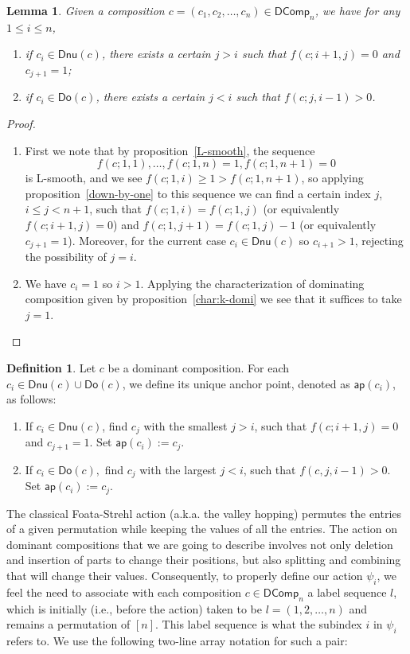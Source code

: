 \documentclass[reqno]{amsart}
\numberwithin{equation}{section}
\newtheorem{lemma}[theorem]{Lemma}
\theoremstyle{definition}
\newtheorem{definition}{Definition}[section]
\theoremstyle{named}
\def\DComp{\mathsf{DComp}}
\def\Dnu{\mathsf{Dnu}}
\def\Do{\mathsf{Do}}
\def\ap{\mathsf{ap}}
\begin{document}
\renewcommand\theenumi{\roman{enumi}}
\renewcommand\labelenumi{(\theenumi)}
\begin{lemma}\label{lemma-ap}
Given a composition $c=\left(c_1, c_2, \ldots, c_n\right) \in \DComp_n$, we have for any $1\le i\le n$,
\begin{enumerate}
	\item if $c_i\in \Dnu(c)$, there exists a certain $j>i$ such that $f(c;i+1,j)=0$ and $c_{j+1}=1$;
	\item if $c_i\in \Do(c)$, there exists a certain $j<i$ such that  $f(c;j,i-1)>0$. 
\end{enumerate}
\end{lemma}
\begin{proof}
\begin{enumerate}
	\item First we note that by proposition~\ref{L-smooth}, the sequence $$f(c;1,1),\ldots,f(c;1,n)=1,f(c;1,n+1)=0$$ is L-smooth, and we see $f(c;1,i)\ge 1>f(c;1,n+1)$, so applying proposition~\ref{down-by-one} to this sequence we can find a certain index $j$, $i\le j<n+1$, such that $f(c;1,i)=f(c;1,j)$ (or equivalently $f(c;i+1,j)=0$) and $f(c;1,j+1)=f(c;1,j)-1$ (or equivalently $c_{j+1}=1$). Moreover, for the current case $c_i\in\Dnu(c)$ so $c_{i+1}>1$, rejecting the possibility of $j=i$.\\
  \item We have $c_i=1$ so $i>1$. Applying the characterization of dominating composition given by proposition~\ref{char:k-domi} we see that it suffices to take $j=1$.
\end{enumerate}
\end{proof}
\begin{definition}\label{def:anchor}
Let $c$ be a dominant composition. For each $c_i\in \Dnu(c)\cup \Do(c)$, we define its unique anchor point, denoted as $\ap(c_i)$, as follows:
\begin{enumerate}
	\item If $c_i\in \Dnu(c)$, find $c_j$ with the smallest $j > i$, such that $f(c;i + 1,j) = 0$ and $c_{j+1 } = 1$. Set $\ap(c_i):= c_j$. %
	\item If $c_i\in \Do(c),$ find $c_j$ with the largest $j < i$, such that $f (c,j,i-1) > 0$. Set $\ap(c_i):= c_j$. %
\end{enumerate}
\end{definition}
The classical Foata-Strehl action \cite[Chap.~4.1]{Ath2018} (a.k.a. the valley hopping) permutes the entries of a given permutation while keeping the values of all the entries. The action on dominant compositions that we are going to describe involves not only deletion and insertion of parts to change their positions, but also splitting and combining that will change their values. Consequently, to properly define our action $\psi_i$, we feel the need to associate with each composition $c\in\DComp_n$ a label sequence $l$, which is initially (i.e., before the action) taken to be $l=(1,2,\ldots,n)$ and remains a permutation of $[n]$. This label sequence is what the subindex $i$ in $\psi_i$ refers to. We use the following two-line array notation for such a pair:
\end{document}
